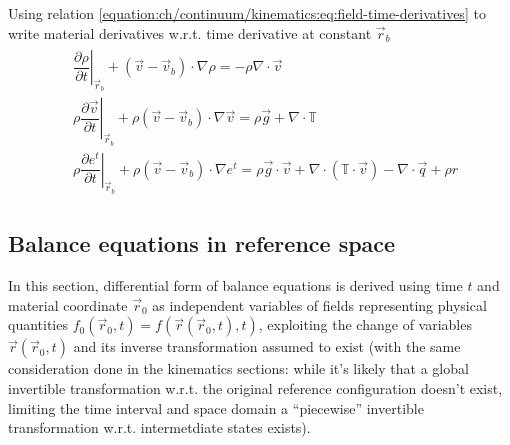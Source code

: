 \documentclass[letterpaper,10pt,english]{jupyterBook}
\begin{document}
\sphinxAtStartPar
{}

\sphinxAtStartPar
{} Using relation \eqref{equation:ch/continuum/kinematics:eq:field-time-derivatives} to write material derivatives w.r.t. time derivative at constant \(\vec{r}_b\)
\begin{equation*}
\begin{split}\begin{aligned}
 &      \left.\dfrac{\partial \rho   }{\partial t}\right|_{\vec{r}_b} + \left( \vec{v} - \vec{v}_b \right) \cdot \nabla \rho    = - \rho \nabla \cdot \vec{v} \\
 & \rho \left.\dfrac{\partial \vec{v}}{\partial t}\right|_{\vec{r}_b} + \rho \left( \vec{v} - \vec{v}_b \right) \cdot \nabla \vec{v} = \rho \vec{g} + \nabla \cdot \mathbb{T} \\
 & \rho \left.\dfrac{\partial e^t    }{\partial t}\right|_{\vec{r}_b} + \rho \left( \vec{v} - \vec{v}_b \right) \cdot \nabla e^t     = \rho \vec{g} \cdot \vec{v} + \nabla \cdot \left( \mathbb{T} \cdot \vec{v} \right) - \nabla \cdot \vec{q} + \rho r
\end{aligned}\end{split}
\end{equation*}

\subsection{Balance equations in reference space}
\label{\detokenize{ch/continuum/balance-primary-differential:balance-equations-in-reference-space}}\label{\detokenize{ch/continuum/balance-primary-differential:continuum-governing-equations-primary-integral-reference}}
\sphinxAtStartPar
In this section, differential form of balance equations is derived using time \(t\) and material coordinate \(\vec{r}_0\) as independent variables of fields representing physical quantities \(f_0(\vec{r}_0,t) = f(\vec{r}(\vec{r}_0, t), t)\), exploiting the change of variables \(\vec{r}(\vec{r}_0, t)\) and its inverse transformation \sphinxhyphen{} assumed to exist (with the same consideration done in the kinematics sections: while it’s likely that a global invertible transformation w.r.t. the original reference configuration doesn’t exist, limiting the time interval and space domain a “piecewise” invertible transformation w.r.t. intermetdiate states exists).



\sphinxstepscope
\end{document}

